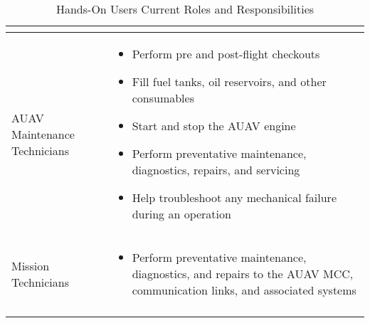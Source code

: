 \begin{fullwidth}
\begin{longtable}{ | p{5cm} | p{12cm} | }
\begin{itemize}
        \end{itemize} \\
        \hline
        AUAV Maintenance Technicians &
        \begin{itemize}
            \item Perform pre and post-flight checkouts
            \item Fill fuel tanks, oil reservoirs, and other consumables
            \item Start and stop the AUAV engine
            \item Perform preventative maintenance, diagnostics, repairs, and servicing
            \item Help troubleshoot any mechanical failure during an operation
        \end{itemize} \\
        \hline
        Mission Technicians &
        \begin{itemize}
            \item Perform preventative maintenance, diagnostics, and repairs to the AUAV MCC, communication links, and associated systems
        \end{itemize} \\
        \hline
        \caption{Hands-On Users Current Roles and Responsibilities}
        \label{tab:hands_on_users}
    \end{longtable}
\end{fullwidth}